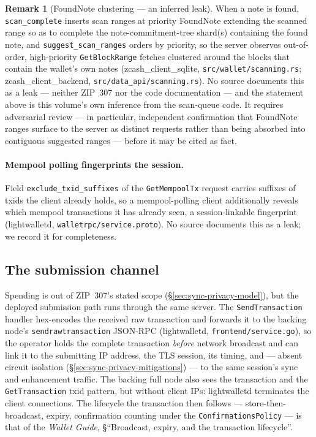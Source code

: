 \documentclass[11pt,a4paper]{article}
\theoremstyle{definition}
\newtheorem{remark}[theorem]{Remark}
\begin{document}
\begin{remark}[FoundNote clustering --- an inferred leak]
\label{rem:sync-foundnote}
When a note is found, \texttt{scan\_complete} inserts scan ranges at
priority \textsf{FoundNote} extending the scanned range so as to complete
the note-commitment-tree shard(s) containing the found note, and
\texttt{suggest\_scan\_ranges} orders by priority, so the server observes
out-of-order, high-priority \texttt{GetBlockRange} fetches clustered around
the blocks that contain the wallet's own notes
(\textsf{zcash\_client\_sqlite}, \texttt{src/wallet/scanning.rs};
\textsf{zcash\_client\_backend}, \texttt{src/data\_api/scanning.rs}). No
source documents this as a leak --- neither ZIP~307 nor the code
documentation --- and the statement above is this volume's own inference
from the scan-queue code. It requires adversarial review --- in
particular, independent confirmation that \textsf{FoundNote} ranges surface
to the server as distinct requests rather than being absorbed into
contiguous suggested ranges --- before it may be cited as fact.
\end{remark}

\paragraph{Mempool polling fingerprints the session.} Field
\texttt{exclude\_txid\_suffixes} of the \texttt{GetMempoolTx} request
carries suffixes of txids the client already holds, so a mempool-polling
client additionally reveals which mempool transactions it has already
seen, a session-linkable fingerprint (\textsf{lightwalletd},
\texttt{walletrpc/service.proto}). No source documents this as a leak; we
record it for completeness.

\subsection{The submission channel}\label{sec:sync-privacy-submit}

Spending is out of ZIP~307's stated scope
(\S\ref{sec:sync-privacy-model}), but the deployed submission path runs
through the same server. The \texttt{SendTransaction} handler hex-encodes
the received raw transaction and forwards it to the backing node's
\texttt{sendrawtransaction} JSON-RPC (\textsf{lightwalletd},
\texttt{frontend/service.go}), so the operator holds the complete
transaction \emph{before} network broadcast and can link it to the
submitting IP address, the TLS session, its timing, and --- absent circuit
isolation (\S\ref{sec:sync-privacy-mitigations}) --- to the same session's
sync and enhancement traffic. The backing full node also sees the
transaction and the \texttt{GetTransaction} txid pattern, but without
client IPs: \textsf{lightwalletd} terminates the client connections. The
lifecycle the transaction then follows --- store-then-broadcast, expiry,
confirmation counting under the \texttt{ConfirmationsPolicy} --- is that of
the \emph{Wallet Guide}, \S``Broadcast, expiry, and the transaction
lifecycle''.
\end{document}
